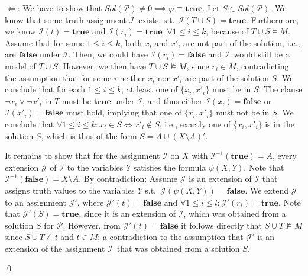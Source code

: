\documentclass [11pt]{article}
\newcommand{\ra}{\rightarrow}
\renewcommand{\phi}{\varphi}
\newcommand{\True}{\mathbf{true}}
\newcommand{\False}{\mathbf{false}}
\newcommand{\pap}{\ensuremath{\mathcal{P}}}
\newcommand{\mI}{\ensuremath{\mathcal{I}}}
\newcommand{\mJ}{\ensuremath{\mathcal{J}}}
\newcommand{\mJp}{\ensuremath{\mathcal{J'}}}
\begin{document}
$\Leftarrow$: 
We have to show that $Sol(\pap) \neq 0 \implies \phi \equiv \True$.
Let $S \in Sol(\pap)$. 
We know that some truth assignment \mI\ exists, s.t.\ $\mI(T\cup S) = \True$.
Furthermore, we know $\mI(t) = \True$ and $\mI(r_i) = \True \; \;\forall 1\leq i \leq k$, because of $T \cup S \models M$.
Assume that for some $1\leq i\leq k$, both $x_i$ and $x'_i$ are not part of the solution, i.e., are $\False$ under \mI. 
Then, we could have $\mI(r_i) = \False$ and \mI\ would still be a model of $T\cup S$. 
However, we then have $T \cup S \not \models M$, since $r_i \in M$, contradicting the assumption that for some $i$  neither $x_i$ nor $x'_i$ are part of the solution $S$.
We conclude that for each $1\leq i \leq k$, at least one of $\{x_i, x'_i\}$ must be in $S$.
The clause $\neg x_i \lor \neg x'_i$ in $T$ must be $\True$ under \mI, and thus either $\mI(x_i) = \False$ or $\mI(x'_i) = \False$ must hold, implying that one of $\{x_i, x'_i\}$ must not be in $S$.
We conclude that $\forall 1\leq i \leq k: x_i \in S \iff x'_i \not \in S$, i.e., exactly one of $\{x_i, x'_i\}$ is in the solution $S$, which is thus of the form $S = A \cup (X \setminus A)'$.

It remains to show that for the assignment $\mI$ on $X$ with $\mI^{-1}(\True) = A$, 
every extension $\mJ$ of $\mI$ to the variables $Y$ satisfies the formula $\psi(X,Y)$. 
Note that $\mI^{-1}(\False) = X\setminus A$.
By contradiction: Assume $\mJ$ is an extension of $\mI$ that assigns truth values to the variables $Y$ s.t.\ $\mJ(\psi(X,Y)) =\False$.
We extend $\mJ$ to an assignment $\mJp$, where $\mJp(t) = \False$ and $\forall 1 \leq i \leq l: \mJp(r_i) = \True$.
Note that $\mJp(S) = \True$, since it is an extension of $\mI$, which was obtained from a solution $S$ for $\pap$.
However, from $\mJp(t) = \False$ it follows directly that $S\cup T \not \models M$ since $S\cup T \not \models  t$ and $t \in M$; a contradiction to the assumption that $\mJp$ is an extension of the assignment \mI\ that was obtained from a solution $S$.

\qed
\medskip
\end{document}
